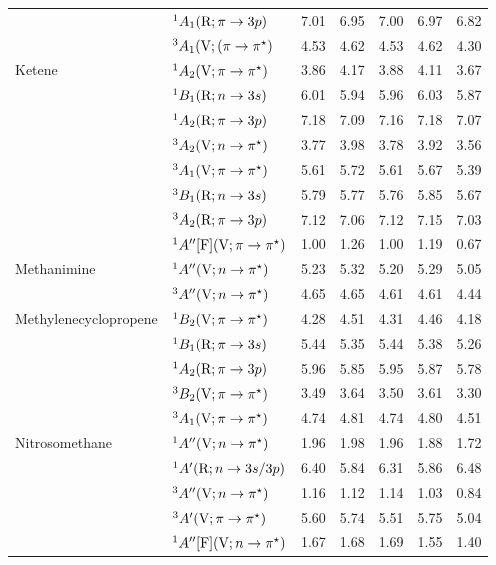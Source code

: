 \begin{tabular}{p{3.5cm}p{3.3cm}c|cccc}
        &$^1A_1 (\mathrm{R}; \pi \rightarrow 3p)$				& 7.01   	&6.95	&7.00	&6.97	&6.82 \\	
        &$^3A_1 (\mathrm{V}; (\pi \rightarrow \pi^\star)$				& 4.53   	&4.62	&4.53	&4.62	&4.30 \\	
  Ketene		&$^1A_2 (\mathrm{V};\pi \rightarrow \pi^\star)$ 				&3.86	&4.17	&3.88	&4.11	&3.67 	\\
        &$^1B_1 (\mathrm{R};n \rightarrow 3s)$ 					&6.01	&5.94	&5.96	&6.03	&5.87	\\
        &$^1A_2 (\mathrm{R};\pi \rightarrow 3p)$ 				&7.18	&7.09	&7.16	&7.18	&7.07	\\
        &$^3A_2 (\mathrm{V};n \rightarrow \pi^\star)$ 					&3.77	&3.98	&3.78	&3.92	&3.56 	\\
        &$^3A_1 (\mathrm{V};\pi \rightarrow \pi^\star)$ 				&5.61	&5.72	&5.61	&5.67	&5.39 	\\
        &$^3B_1 (\mathrm{R};n \rightarrow 3s)$ 					&5.79	&5.77	&5.76	&5.85	&5.67	\\
        &$^3A_2 (\mathrm{R};\pi \rightarrow 3p)$ 				&7.12	&7.06	&7.12	&7.15	&7.03 	\\
        &$^1A^{\prime\prime} [\mathrm{F}] (\mathrm{V};\pi \rightarrow \pi^\star)$	&1.00		&1.26	&1.00	&1.19	&0.67	\\
  Methanimine	&$^1A^{\prime\prime} (\mathrm{V}; n \rightarrow \pi^\star)$ 					&5.23	&5.32	&5.20	&5.29	&5.05	\\
        &$^3A^{\prime\prime} (\mathrm{V}; n \rightarrow \pi^\star)$					&4.65	&4.65	&4.61	&4.61	&4.44	\\
  Methylenecyclopropene&	$^1B_2 (\mathrm{V}; \pi \rightarrow \pi^\star)$			& 4.28	&4.51	&4.31	&4.46	&4.18 \\	
        &$^1B_1 (\mathrm{R}; \pi \rightarrow 3s)$				& 5.44	&5.35	&5.44	&5.38	&5.26 \\	
        &$^1A_2 (\mathrm{R}; \pi \rightarrow 3p)$				& 5.96	&5.85	&5.95	&5.87	&5.78 \\	
        &$^3B_2 (\mathrm{V}; \pi \rightarrow \pi^\star)$				& 3.49	&3.64	&3.50	&3.61	&3.30\\
        &$^3A_1 (\mathrm{V}; \pi \rightarrow \pi^\star)$				& 4.74	&4.81	&4.74	&4.80	&4.51\\ 	
  Nitrosomethane&$^1A^{\prime\prime} (\mathrm{V};n \rightarrow \pi^\star)$					&1.96	&1.98	&1.96	&1.88	&1.72	\\
        &$^1A^\prime (\mathrm{R};n \rightarrow 3s/3p)$ 				&6.40	&5.84	&6.31	&5.86	&6.48	\\
        &$^3A^{\prime\prime} (\mathrm{V};n \rightarrow \pi^\star)$					&1.16	&1.12	&1.14	&1.03	&0.84	\\
        &$^3A^\prime (\mathrm{V};\pi \rightarrow \pi^\star)$					&5.60	&5.74	&5.51	&5.75	&5.04	\\
        &$^1A^{\prime\prime} [\mathrm{F}]	(\mathrm{V};n \rightarrow \pi^\star)$				&1.67	&1.68	&1.69	&1.55	&1.40	\\

\end{tabular}
